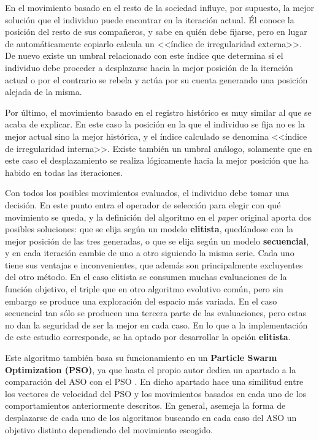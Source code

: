 En el movimiento basado en el resto de la sociedad influye, por supuesto, la mejor solución que el individuo puede encontrar en la iteración actual. Él conoce la posición del resto de sus compañeros, y sabe en quién debe fijarse, pero en lugar de automáticamente copiarlo calcula un <<índice de irregularidad externa>>. De nuevo existe un umbral relacionado con este índice que determina si el individuo debe proceder a desplazarse hacia la mejor posición de la iteración actual o por el contrario se rebela y actúa por su cuenta generando una posición alejada de la misma.

Por último, el movimiento basado en el registro histórico es muy similar al que se acaba de explicar. En este caso la posición en la que el individuo se fija no es la mejor actual sino la mejor histórica, y el índice calculado se denomina <<índice de irregularidad interna>>. Existe también un umbral análogo, solamente que en este caso el desplazamiento se realiza lógicamente hacia la mejor posición que ha habido en todas las iteraciones.

Con todos los posibles movimientos evaluados, el individuo debe tomar una decisión. En este punto entra el operador de selección para elegir con qué movimiento se queda, y la definición del algoritmo en el \textit{paper} original aporta dos posibles soluciones: que se elija según un modelo \textbf{elitista}, quedándose con la mejor posición de las tres generadas, o que se elija según un modelo \textbf{secuencial}, y en cada iteración cambie de uno a otro siguiendo la misma serie. Cada uno tiene sus ventajas e inconvenientes, que además son principalmente excluyentes del otro método. En el caso elitista se consumen muchas evaluaciones de la función objetivo, el triple que en otro algoritmo evolutivo común, pero sin embargo se produce una exploración del espacio más variada. En el caso secuencial tan sólo se producen una tercera parte de las evaluaciones, pero estas no dan la seguridad de ser la mejor en cada caso. En lo que a la implementación de este estudio corresponde, se ha optado por desarrollar la opción \textbf{elitista}.

Este algoritmo también basa su funcionamiento en un \textbf{Particle Swarm Optimization (PSO)}, ya que hasta el propio autor dedica un apartado a la comparación del ASO con el PSO \cite{aso-conference}. En dicho apartado hace una similitud entre los vectores de velocidad del PSO y los movimientos basados en cada uno de los comportamientos anteriormente descritos. En general, asemeja la forma de desplazarse de cada uno de los algoritmos buscando en cada caso del ASO un objetivo distinto dependiendo del movimiento escogido.

